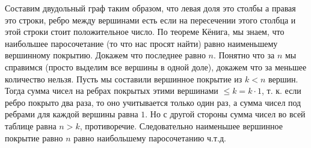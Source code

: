 Составим двудольный граф таким образом, что левая доля это столбы а правая это строки, ребро между вершинами есть если на пересечении этого столбца и этой строки стоит положительное число. По теореме Кёнига, мы знаем, что наибольшее паросочетание (то что нас просят найти) равно наименьшему вершинному покрытию. Докажем что последнее равно $n$. Понятно что за $n$ мы справимся (просто выделим все вершины в одной доле), докажем что за меньшее количество нельзя. Пусть мы составили вершинное покрытие из $k<n$ вершин. Тогда сумма чисел на ребрах покрытых этими вершинами $\leq k = k \cdot 1$, т. к. если ребро покрыто два раза, то оно учитывается только один раз, а сумма чисел под ребрами для каждой вершины равна $1$. Но с другой стороны сумма чисел во всей таблице равна $n > k$, противоречие. Следовательно наименьшее вершинное покрытие равно $n$ равно наибольшему паросочетанию ч.т.д.